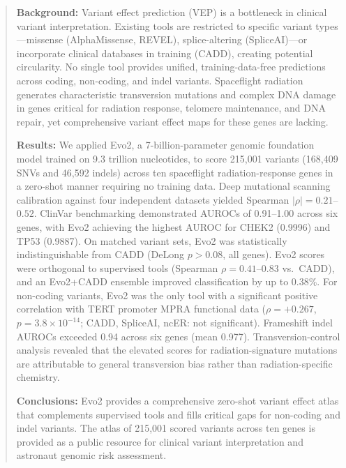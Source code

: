 \begin{abstract}

\textbf{Background:}
Variant effect prediction (VEP) is a bottleneck in clinical variant
interpretation. Existing tools are restricted to specific variant types---missense
(AlphaMissense, REVEL), splice-altering (SpliceAI)---or incorporate clinical
databases in training (CADD), creating potential circularity. No single tool
provides unified, training-data-free predictions across coding, non-coding, and
indel variants. Spaceflight radiation generates characteristic transversion
mutations and complex DNA damage in genes critical for radiation response,
telomere maintenance, and DNA repair, yet comprehensive variant effect maps
for these genes are lacking.

\textbf{Results:}
We applied Evo2, a 7-billion-parameter genomic foundation model trained on 9.3
trillion nucleotides, to score 215,001 variants (168,409 SNVs and 46,592 indels)
across ten spaceflight radiation-response genes in a zero-shot manner requiring
no training data. Deep mutational scanning calibration against four independent
datasets yielded Spearman $|\rho| = 0.21$--$0.52$. ClinVar benchmarking
demonstrated AUROCs of 0.91--1.00 across six genes, with Evo2 achieving the
highest AUROC for CHEK2 (0.9996) and TP53 (0.9887). On matched variant sets,
Evo2 was statistically indistinguishable from CADD (DeLong $p > 0.08$, all
genes). Evo2 scores were orthogonal to supervised tools (Spearman $\rho =
0.41$--$0.83$ vs.\ CADD), and an Evo2+CADD ensemble improved classification
by up to 0.38\%. For non-coding variants, Evo2 was the only tool with a
significant positive correlation with TERT promoter MPRA functional data
($\rho = +0.267$, $p = 3.8 \times 10^{-14}$; CADD, SpliceAI, ncER: not
significant). Frameshift indel AUROCs exceeded 0.94 across six genes (mean
0.977). Transversion-control analysis revealed that the elevated scores for
radiation-signature mutations are attributable to general transversion bias
rather than radiation-specific chemistry.

\textbf{Conclusions:}
Evo2 provides a comprehensive zero-shot variant effect atlas that complements
supervised tools and fills critical gaps for non-coding and indel variants.
The atlas of 215,001 scored variants across ten genes is provided as a
public resource for clinical variant interpretation and astronaut genomic
risk assessment.

\end{abstract}

